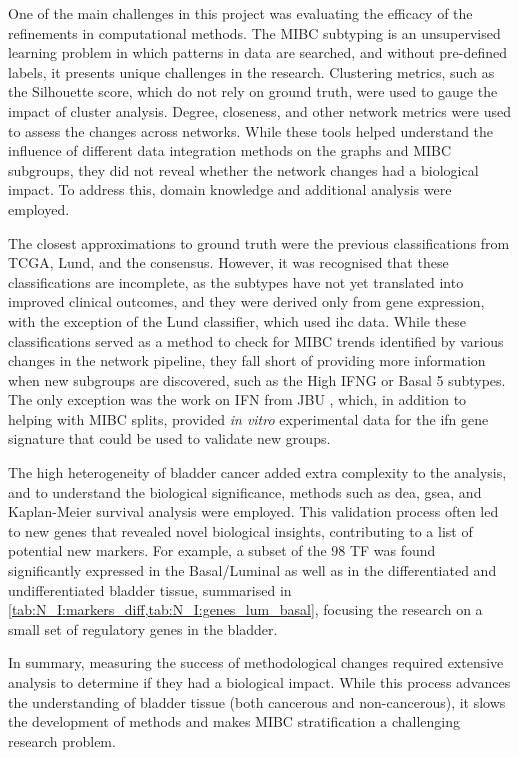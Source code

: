 One of the main challenges in this project was evaluating the efficacy of the refinements in computational methods. The MIBC subtyping is an unsupervised learning problem in which patterns in data are searched, and without pre-defined labels, it presents unique challenges in the research. Clustering metrics, such as the Silhouette score, which do not rely on ground truth, were used to gauge the impact of cluster analysis. Degree, closeness, and other network metrics were used to assess the changes across networks. While these tools helped understand the influence of different data integration methods on the graphs and MIBC subgroups, they did not reveal whether the network changes had a biological impact. To address this, domain knowledge and additional analysis were employed.

The closest approximations to ground truth were the previous classifications from TCGA, Lund, and the consensus. However, it was recognised that these classifications are incomplete, as the subtypes have not yet translated into improved clinical outcomes, and they were derived only from gene expression, with the exception of the Lund classifier, which used \acrlong{ihc} data. While these classifications served as a method to check for MIBC trends identified by various changes in the network pipeline, they fall short of providing more information when new subgroups are discovered, such as the High IFNG or Basal 5 subtypes. The only exception was the work on \gls{IFN} from JBU \citep{Baker2022-bj}, which, in addition to helping with MIBC splits, provided \textit{in vitro} experimental data for the \acrshort{ifn} gene signature that could be used to validate new groups.

The high heterogeneity of bladder cancer added extra complexity to the analysis, and to understand the biological significance, methods such as \acrlong{dea}, \acrlong{gsea}, and Kaplan-Meier survival analysis were employed. This validation process often led to new genes that revealed novel biological insights, contributing to a list of potential new markers. For example, a subset of the 98 TF was found significantly expressed in the Basal/Luminal as well as in the differentiated and undifferentiated bladder tissue, summarised in \cref{tab:N_I:markers_diff,tab:N_I:genes_lum_basal}, focusing the research on a small set of regulatory genes in the bladder.


In summary, measuring the success of methodological changes required extensive analysis to determine if they had a biological impact. While this process advances the understanding of bladder tissue (both cancerous and non-cancerous), it slows the development of methods and makes MIBC stratification a challenging research problem.

